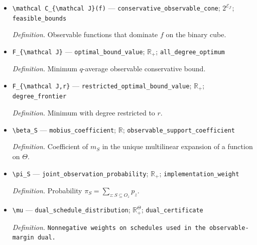\documentclass{article}
\begin{document}
\begin{itemize}
  \par\smallskip\noindent\emph{Definition.} Prespecified full-support objective weights; \(q\) is not a law for the fixed schedule.
  \item \texttt{\textbackslash{}\allowbreak{}mathcal C\_\allowbreak{}\{\textbackslash{}\allowbreak{}mathcal J\}\allowbreak{}(f)} --- \texttt{conservative\_\allowbreak{}observable\_\allowbreak{}cone}; \(2^{\mathcal E_{\mathcal J}}\); \texttt{feasible\_\allowbreak{}bounds}
  \par\smallskip\noindent\emph{Definition.} Observable functions that dominate \(f\) on the binary cube.
  \item \texttt{F\_\allowbreak{}\{\textbackslash{}\allowbreak{}mathcal J\}\allowbreak{}} --- \texttt{optimal\_\allowbreak{}bound\_\allowbreak{}value}; \(\mathbb R_+\); \texttt{all\_\allowbreak{}degree\_\allowbreak{}optimum}
  \par\smallskip\noindent\emph{Definition.} Minimum \(q\)-average observable conservative bound.
  \item \texttt{F\_\allowbreak{}\{\textbackslash{}\allowbreak{}mathcal J,\allowbreak{}r\}\allowbreak{}} --- \texttt{restricted\_\allowbreak{}optimal\_\allowbreak{}bound\_\allowbreak{}value}; \(\mathbb R_+\); \texttt{degree\_\allowbreak{}frontier}
  \par\smallskip\noindent\emph{Definition.} Minimum with degree restricted to \(r\).
  \item \texttt{\textbackslash{}\allowbreak{}beta\_\allowbreak{}S} --- \texttt{mobius\_\allowbreak{}coefficient}; \(\mathbb R\); \texttt{observable\_\allowbreak{}support\_\allowbreak{}coefficient}
  \par\smallskip\noindent\emph{Definition.} Coefficient of \(m_S\) in the unique multilinear expansion of a function on \(\Theta\).
  \item \texttt{\textbackslash{}\allowbreak{}pi\_\allowbreak{}S} --- \texttt{joint\_\allowbreak{}observation\_\allowbreak{}probability}; \(\mathbb R_+\); \texttt{implementation\_\allowbreak{}weight}
  \par\smallskip\noindent\emph{Definition.} Probability \(\pi_S=\sum_{z:S\subseteq O_z}p_z\).
  \item \texttt{\textbackslash{}\allowbreak{}mu} --- \texttt{dual\_\allowbreak{}schedule\_\allowbreak{}distribution}; \(\mathbb R_+^\Theta\); \texttt{dual\_\allowbreak{}certificate}
  \par\smallskip\noindent\emph{Definition.} \texttt{Nonnegative weights on schedules used in the observable-\allowbreak{}margin dual.}

\end{itemize}
\end{document}
